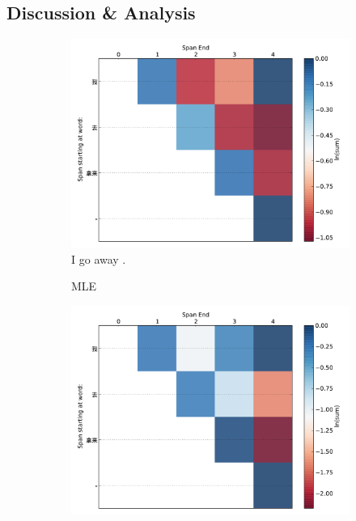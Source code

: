 \documentclass[11pt]{article}
\begin{document}
\subsection{Discussion \& Analysis}
\begin{figure}[t!]
	\begin{center}
	\begin{subfigure}{0.67\columnwidth}
		\centering
		\includegraphics[width=1.1\columnwidth,keepaspectratio=true]{./mle0.pdf}	
		I go away .
		\caption{\small MLE}
		\label{fig:mle0}			
	\end{subfigure}
	\begin{subfigure}{0.67\columnwidth}
		\centering
		\includegraphics[width=1.1\columnwidth,keepaspectratio=true]{./spec0.pdf}		

\end{subfigure}
\end{center}
\end{figure}
\end{document}

